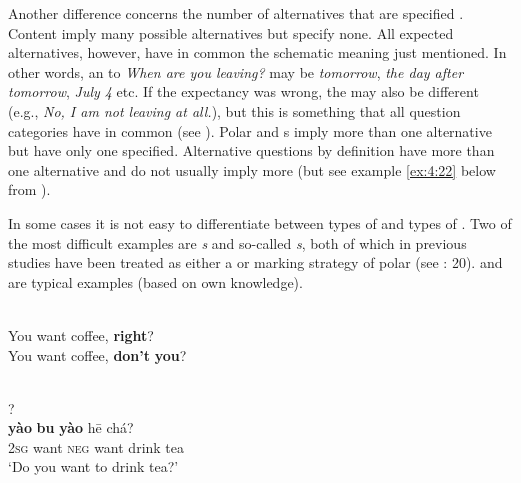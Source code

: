 Another difference concerns the number of alternatives that are specified \citep[260]{Dik1997}. Content  imply many possible alternatives but specify none. All expected alternatives, however, have in common the schematic meaning just mentioned. In other words, an  to \textit{When are you leaving?} may be \textit{tomorrow}, \textit{the day after tomorrow}, \textit{July 4} etc. If the expectancy was wrong, the  may also be different (e.g., \textit{No, I am not leaving at all.}), but this is something that all question categories have in common (see ). Polar and s imply more than one alternative but have only one specified. Alternative questions by definition have more than one alternative and do not usually imply more (but see example \ref{ex:4:22} below from ).

In some cases it is not easy to differentiate between types of  and types of . Two of the most difficult examples are \textit{s} and so-called \textit{s}, both of which in previous studies have been treated as either a  or marking strategy of polar  (see \citealt{Hölzl2016a}: 20).  and  are typical examples (based on own knowledge).

\ea%
    \label{ex:4:5}
    \ea
    \\
      You want coffee, \textbf{{right}}?\\

    \ex
      You want coffee, \textbf{{don’t}} \textbf{{you}}?\\
    \z
    \z

\ea%
    \label{ex:4:6}
    \\
    ?\\
     \textbf{{yào}}  \textbf{{bu}}  \textbf{{yào}} h\=e  chá?\\
    2\textsc{sg}  want  \textsc{neg}  want  drink  tea\\
    \glt ‘Do you want to drink tea?’
    \z

